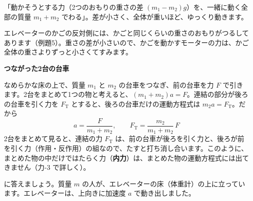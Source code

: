 \begin{phyomi}[$a=\dfrac{m_1-m_2}{m_1+m_2}\,g$]
「動かそうとする力（2つのおもりの重さの差 $(m_1-m_2)g$）を、一緒に動く全部の質量 $m_1+m_2$ でわる」。差が小さく、全体が重いほど、ゆっくり動きます。
\end{phyomi}
\begin{phmijika}[エレベーターのつり合いおもり]
エレベーターのかごの反対側には、かごと同じくらいの重さのおもりがつるしてあります（例題5）。重さの差が小さいので、かごを動かすモーターの力は、かご全体の重さよりずっと小さくてすみます。
\end{phmijika}

\noindent\textbf{つながった2台の台車}\par
\noindent なめらかな床の上で、質量 $m_1$ と $m_2$ の台車をつなぎ、前の台車を力 $F$ で引きます。2台をまとめて1つの物と考えると、$(m_1+m_2)a=F$。連結の部分が後ろの台車を引く力を $F_{\mathrm T}$ とすると、後ろの台車だけの運動方程式は $m_2a=F_{\mathrm T}$。だから
\[ a=\frac{F}{m_1+m_2},\qquad F_{\mathrm T}=\frac{m_2}{m_1+m_2}\,F \]
2台をまとめて見ると、連結の力 $F_{\mathrm T}$ は、前の台車が後ろを引く力と、後ろが前を引く力（作用・反作用）の組なので、たすと打ち消し合います。このように、まとめた物の中だけではたらく力（\textbf{内力}）は、まとめた物の運動方程式には出てきません（力-3 で詳しく）。

\begin{phflow}[斜面と滑車]
\end{phflow}


\leavevmode\label{ph:力-2:sec6}\label{ph:力-2:kanseiryoku}\bkhatenaref に答えましょう。質量 $m$ の人が、エレベーターの床（体重計）の上に立っています。エレベーターは、上向きに加速度 $a$ で動き出しました。

